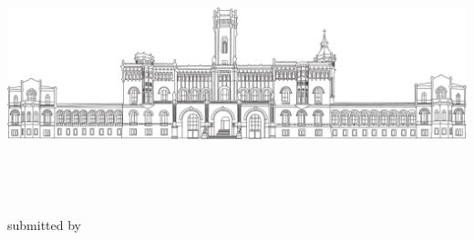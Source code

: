 \begin{titlepage}
  \changetext{}{21mm}{}{19mm}{}
  \vspace{1cm}
  \begin{center}
    \includegraphics[width=13.8cm]{img/welfenschloss} \\
  \end{center}
  \medskip
  \begin{center}
    \textbf{\huge{}\LARGE{}}
    \textbf{\huge{}\LARGE{}}
    \textbf{\huge{}\LARGE{}} \\
  \end{center}

  \begin{center}
    \normalsize
     \\
    \smallskip
  \end{center}
  \vfill
  \vfill


  {
    \begin{center}
      \LARGE \myTitle{}
    \end{center}
    \vfill
    \vfill

    \begin{center}
      \LARGE \textbf{\myDegree}
    \end{center}
    \vfill

    \begin{center}
      \large submitted by \\
    \end{center}

}
\end{titlepage}
